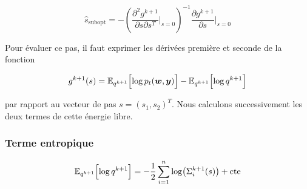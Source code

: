 \documentclass[12pt]{article}
\newcommand{\w}{\boldsymbol{w}}
\newcommand{\y}{\boldsymbol{y}}
\begin{document}
\begin{rappelbox}
\label{res:subopt_step}
\begin{equation}
    \boxed{\hat{s}_{\mathrm{subopt}} = -\left(\frac{\partial^2 g^{k+1}}{\partial s \partial s^T}\bigg|_{s=0}\right)^{-1} \frac{\partial g^{k+1}}{\partial s}\bigg|_{s=0}}
    \label{eq:subopt_step}
\end{equation}
\end{rappelbox}

Pour évaluer ce pas, il faut exprimer les dérivées première et seconde de la fonction
\begin{rappelbox}
\begin{equation}
g^{k+1}(s) = \mathbb{E}_{q^{k+1}}\Bigl[ \log p_t(\w,\y) \Bigr] - \mathbb{E}_{q^{k+1}}\Bigl[ \log q^{k+1}\Bigr]
\end{equation}
\end{rappelbox}
par rapport au vecteur de pas $s = (s_1, s_2)^T$. Nous calculons successivement les deux termes de cette énergie libre.


\subsubsection*{Terme entropique}

\begin{propositionbox}
\begin{equation}
\mathbb{E}_{q^{k+1}}\Bigl[ \log q^{k+1}\Bigr] = - \frac12 \sum_{i=1}^n \log\bigl( \Sigma_i^{k+1}(s)\bigr) + \text{cte}
\end{equation}
\end{propositionbox}
\end{document}
